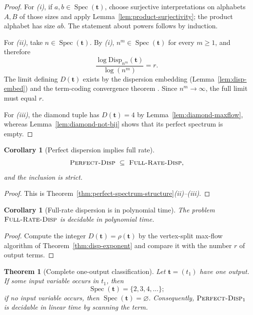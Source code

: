 \documentclass[11pt]{article}
\newcommand{\parencite}[1]{\citep{#1}}
\theoremstyle{definition}
\theoremstyle{plain}
\newtheorem{theorem}[definition]{Theorem}
\newtheorem{corollary}[definition]{Corollary}
\newcommand{\Disp}{\mathrm{Disp}}
\newcommand{\PerfSpec}{\operatorname{Spec}}
\begin{document}
\begin{proof}
For \textit{(i)}, if $a,b\in\PerfSpec(\mathbf t)$, choose surjective interpretations on alphabets $A,B$ of
those sizes and apply Lemma~\ref{lem:product-surjectivity}; the product alphabet has size $ab$.  The statement
about powers follows by induction.

For \textit{(ii)}, take $n\in\PerfSpec(\mathbf t)$.  By \textit{(i)},
$n^m\in\PerfSpec(\mathbf t)$ for every $m\ge1$, and therefore
\[
\frac{\log\Disp_{n^m}(\mathbf t)}{\log(n^m)}=r.
\]
The limit defining $D(\mathbf t)$ exists by the dispersion embedding
(Lemma~\ref{lem:disp-embed}) and the term-coding convergence theorem
\parencite{riis2026termcoding}.  Since $n^m\to\infty$, the full limit must equal $r$.

For \textit{(iii)}, the diamond tuple has $D(\mathbf t)=4$ by Lemma~\ref{lem:diamond-maxflow}, whereas
Lemma~\ref{lem:diamond-not-bij} shows that its perfect spectrum is empty.
\end{proof}

\begin{corollary}[Perfect dispersion implies full rate]
\label{thm:perfect-implies-full-rate}
\[
\textsc{Perfect-Disp}\ \subseteq\ \textsc{Full-Rate-Disp},
\]
and the inclusion is strict.
\end{corollary}

\begin{proof}
This is Theorem~\ref{thm:perfect-spectrum-structure}\textit{(ii)--(iii)}.
\end{proof}

\begin{corollary}[Full-rate dispersion is in polynomial time]
\label{cor:full-rate-ptime}
The problem $\textsc{Full-Rate-Disp}$ is decidable in polynomial time.
\end{corollary}

\begin{proof}
Compute the integer $D(\mathbf t)=\rho(\mathbf t)$ by the vertex-split max-flow algorithm of
Theorem~\ref{thm:disp-exponent} and compare it with the number $r$ of output terms.
\end{proof}

\begin{theorem}[Complete one-output classification]
\label{thm:one-output}
Let $\mathbf t=(t_1)$ have one output.  If some input variable occurs in $t_1$, then
\[
\PerfSpec(\mathbf t)=\{2,3,4,\ldots\};
\]
if no input variable occurs, then $\PerfSpec(\mathbf t)=\varnothing$.
Consequently, $\textsc{Perfect-Disp}_1$ is decidable in linear time by scanning the term.
\end{theorem}
\end{document}
